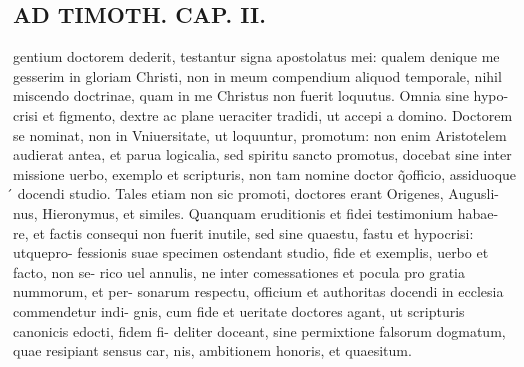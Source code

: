 \documentclass{article}
\begin{document}
\begin{pages}
\section*{AD TIMOTH. CAP. II. }
\marginpar{[ p.485 ]}\pstart gentium doctorem dederit, testantur signa apostolatus mei: qualem denique  me gesserim in gloriam Christi, non in meum compendium aliquod temporale, nihil miscendo doctrinae, quam in me Christus non fuerit loquutus. Omnia sine hypo- crisi et figmento, dextre ac plane ueraciter tradidi, ut accepi a domino. Doctorem se nominat, non in Vniuersitate, ut loquuntur, promotum: non enim Aristotelem audierat antea, et parua logicalia, sed spiritu sancto promotus, docebat sine inter missione uerbo, exemplo et scripturis, non tam nomine doctor q̃officio, assiduoque ́ docendi studio. Tales etiam non sic promoti, doctores erant Origenes, Augusli- nus, Hieronymus, et similes. Quanquam eruditionis et fidei testimonium habae- re, et factis consequi non fuerit inutile, sed sine quaestu, fastu et hypocrisi: utquepro- fessionis suae specimen ostendant studio, fide et exemplis, uerbo et facto, non se- rico uel annulis, ne inter comessationes et pocula pro gratia nummorum, et per- sonarum respectu, officium et authoritas docendi in ecclesia commendetur indi- gnis, cum fide et ueritate doctores agant, ut scripturis canonicis edocti, fidem fi- deliter doceant, sine permixtione falsorum dogmatum, quae resipiant sensus car, nis, ambitionem honoris, et quaesitum.  \pend
{}
{}

\end{pages}
\end{document}

